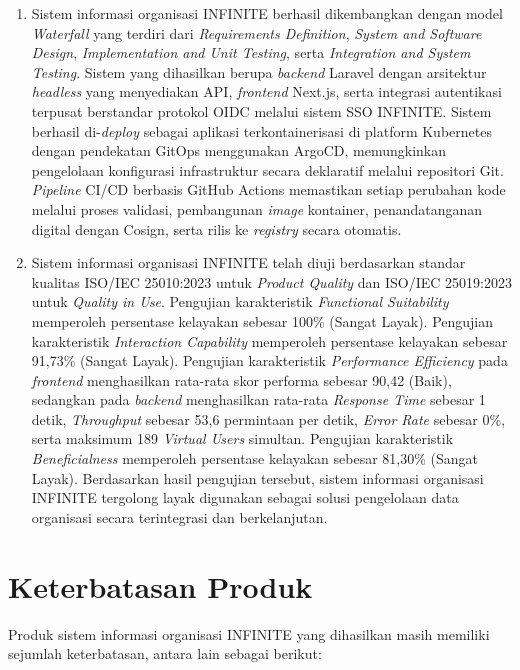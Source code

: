 \begin{enumerate}
    \item Sistem informasi organisasi INFINITE berhasil dikembangkan dengan model \textit{Waterfall} yang terdiri dari \textit{Requirements Definition}, \textit{System and Software Design}, \textit{Implementation and Unit Testing}, serta \textit{Integration and System Testing}. Sistem yang dihasilkan berupa \textit{backend} Laravel dengan arsitektur \textit{headless} yang menyediakan API, \textit{frontend} Next.js, serta integrasi autentikasi terpusat berstandar protokol OIDC melalui sistem SSO INFINITE. Sistem berhasil di-\textit{deploy} sebagai aplikasi terkontainerisasi di platform Kubernetes dengan pendekatan GitOps menggunakan ArgoCD, memungkinkan pengelolaan konfigurasi infrastruktur secara deklaratif melalui repositori Git. \textit{Pipeline} CI/CD berbasis GitHub Actions memastikan setiap perubahan kode melalui proses validasi, pembangunan \textit{image} kontainer, penandatanganan digital dengan Cosign, serta rilis ke \textit{registry} secara otomatis.
    \item Sistem informasi organisasi INFINITE telah diuji berdasarkan standar kualitas ISO/IEC 25010:2023 untuk \textit{Product Quality} dan ISO/IEC 25019:2023 untuk \textit{Quality in Use}. Pengujian karakteristik \textit{Functional Suitability} memperoleh persentase kelayakan sebesar 100\% (Sangat Layak). Pengujian karakteristik \textit{Interaction Capability} memperoleh persentase kelayakan sebesar 91{,}73\% (Sangat Layak). Pengujian karakteristik \textit{Performance Efficiency} pada \textit{frontend} menghasilkan rata-rata skor performa sebesar 90{,}42 (Baik), sedangkan pada \textit{backend} menghasilkan rata-rata \textit{Response Time} sebesar 1 detik, \textit{Throughput} sebesar 53{,}6 permintaan per detik, \textit{Error Rate} sebesar 0\%, serta maksimum 189 \textit{Virtual Users} simultan. Pengujian karakteristik \textit{Beneficialness} memperoleh persentase kelayakan sebesar 81{,}30\% (Sangat Layak). Berdasarkan hasil pengujian tersebut, sistem informasi organisasi INFINITE tergolong layak digunakan sebagai solusi pengelolaan data organisasi secara terintegrasi dan berkelanjutan.
\end{enumerate}

\section{Keterbatasan Produk}

Produk sistem informasi organisasi INFINITE yang dihasilkan masih memiliki sejumlah keterbatasan, antara lain sebagai berikut:

